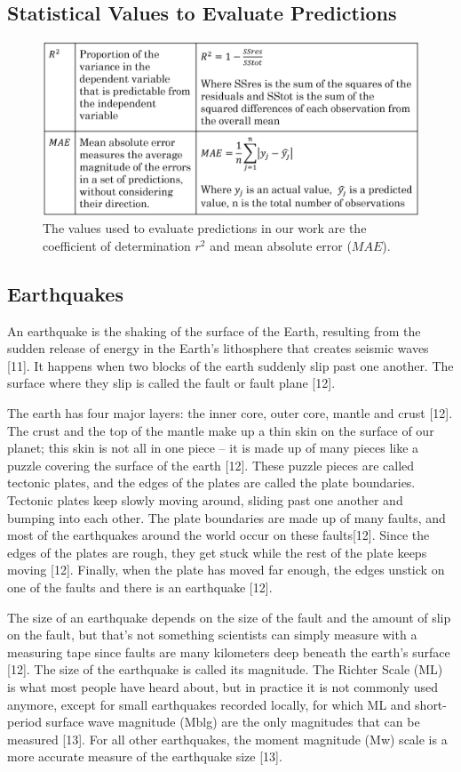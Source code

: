\documentclass[]{llncs} %
\begin{document}
\subsection{Statistical Values to Evaluate Predictions}
\begin{figure}
	\centering
	\includegraphics[width=.9\linewidth]{background}
	\caption{The values used to evaluate predictions in our work are the coefficient of determination $r^2$ and mean absolute error ($MAE$).}
	\label{fig:background}
\end{figure}

\subsection{Earthquakes}
An earthquake is the shaking of the surface of the Earth, resulting from the sudden release of energy in the Earth’s lithosphere that creates seismic waves [11]. It  happens when two blocks of the earth suddenly slip past one another. The surface where they slip is called the fault or fault plane [12].\par
The earth has four major layers: the inner core, outer core, mantle and crust [12]. The crust and the top of the mantle make up a thin skin on the surface of our planet; this skin is not all in one piece – it is made up of many pieces like a puzzle covering the surface of the earth [12]. These puzzle pieces are called tectonic plates, and the edges of the plates are called the plate boundaries.  Tectonic plates  keep slowly moving around, sliding past one another and bumping into each other. The plate boundaries are made up of many faults, and most of the earthquakes around the world occur on these faults[12]. Since the edges of the plates are rough, they get stuck while the rest of the plate keeps moving [12]. Finally, when the plate has moved far enough, the edges unstick on one of the faults and there is an earthquake [12]. \par
The size of an earthquake depends on the size of the fault and the amount of slip on the fault, but that’s not something scientists can simply measure with a measuring tape since faults are many kilometers deep beneath the earth’s surface [12]. The size of the earthquake is called its magnitude. The Richter Scale (ML) is what most people have heard about, but in practice it is not commonly used anymore, except for small earthquakes recorded locally, for which ML and short-period surface wave magnitude (Mblg) are the only magnitudes that can be measured [13]. For all other earthquakes, the moment magnitude (Mw) scale is a more accurate measure of the earthquake size [13]. 
\end{document}
